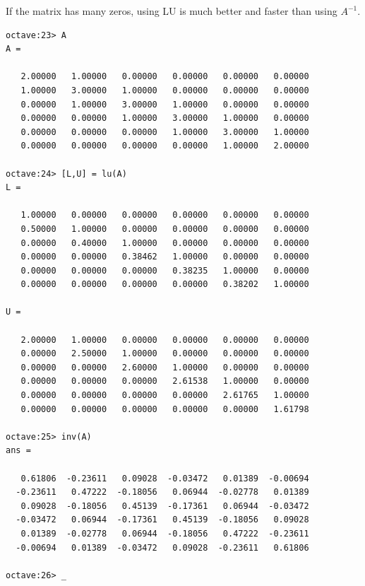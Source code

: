 \documentclass[11pt]{article}
\newcommand{\1}{\mathbf{1}}
\newcommand{\0}{\mathbf{0}}
\begin{document}
If the matrix has many zeros, using LU is much better and faster than using $A^{-1}$.

{\small
\begin{verbatim}
octave:23> A
A =

   2.00000   1.00000   0.00000   0.00000   0.00000   0.00000
   1.00000   3.00000   1.00000   0.00000   0.00000   0.00000
   0.00000   1.00000   3.00000   1.00000   0.00000   0.00000
   0.00000   0.00000   1.00000   3.00000   1.00000   0.00000
   0.00000   0.00000   0.00000   1.00000   3.00000   1.00000
   0.00000   0.00000   0.00000   0.00000   1.00000   2.00000

octave:24> [L,U] = lu(A)
L =

   1.00000   0.00000   0.00000   0.00000   0.00000   0.00000
   0.50000   1.00000   0.00000   0.00000   0.00000   0.00000
   0.00000   0.40000   1.00000   0.00000   0.00000   0.00000
   0.00000   0.00000   0.38462   1.00000   0.00000   0.00000
   0.00000   0.00000   0.00000   0.38235   1.00000   0.00000
   0.00000   0.00000   0.00000   0.00000   0.38202   1.00000

U =

   2.00000   1.00000   0.00000   0.00000   0.00000   0.00000
   0.00000   2.50000   1.00000   0.00000   0.00000   0.00000
   0.00000   0.00000   2.60000   1.00000   0.00000   0.00000
   0.00000   0.00000   0.00000   2.61538   1.00000   0.00000
   0.00000   0.00000   0.00000   0.00000   2.61765   1.00000
   0.00000   0.00000   0.00000   0.00000   0.00000   1.61798

octave:25> inv(A)
ans =

   0.61806  -0.23611   0.09028  -0.03472   0.01389  -0.00694
  -0.23611   0.47222  -0.18056   0.06944  -0.02778   0.01389
   0.09028  -0.18056   0.45139  -0.17361   0.06944  -0.03472
  -0.03472   0.06944  -0.17361   0.45139  -0.18056   0.09028
   0.01389  -0.02778   0.06944  -0.18056   0.47222  -0.23611
  -0.00694   0.01389  -0.03472   0.09028  -0.23611   0.61806

octave:26> _
\end{verbatim}
}
\end{document}
